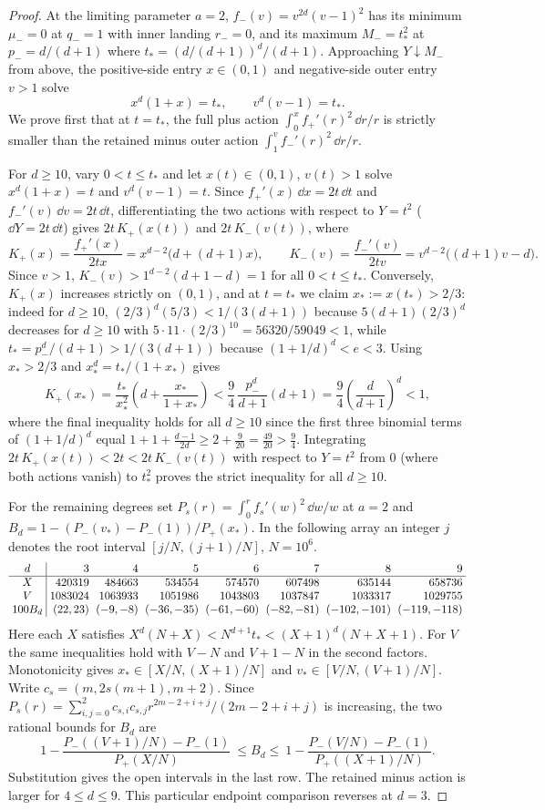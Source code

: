 \begin{proof}
At the limiting parameter $a=2$, $f_-(v)=v^{2d}(v-1)^2$ has its minimum $\mu_-=0$ at $q_-=1$ with inner landing $r_-=0$, and its maximum $M_-=t_*^2$ at $p_-=d/(d+1)$ where $t_*=(d/(d+1))^d/(d+1)$. Approaching $Y\downarrow M_-$ from above, the positive-side entry $x\in(0,1)$ and negative-side outer entry $v>1$ solve
\[
  x^d(1+x) = t_*,\qquad v^d(v-1) = t_*.
\]
We prove first that at $t=t_*$, the full plus action $\int_0^x f_+'(r)^2\,\dd r/r$ is strictly smaller than the retained minus outer action $\int_1^v f_-'(r)^2\,\dd r/r$.

For $d\ge 10$, vary $0<t\le t_*$ and let $x(t)\in(0,1)$, $v(t)>1$ solve $x^d(1+x)=t$ and $v^d(v-1)=t$. Since $f_+'(x)\,\dd x=2t\,\dd t$ and $f_-'(v)\,\dd v=2t\,\dd t$, differentiating the two actions with respect to $Y=t^2$ ($\dd Y=2t\,\dd t$) gives $2t\,K_+(x(t))$ and $2t\,K_-(v(t))$, where
\[
  K_+(x) = \frac{f_+'(x)}{2tx} = x^{d-2}\big(d+(d+1)x\big),\qquad
  K_-(v) = \frac{f_-'(v)}{2tv} = v^{d-2}\big((d+1)v-d\big).
\]
Since $v>1$, $K_-(v)>1^{d-2}(d+1-d)=1$ for all $0<t\le t_*$. Conversely, $K_+(x)$ increases strictly on $(0,1)$, and at $t=t_*$ we claim $x_*:=x(t_*)>2/3$: indeed for $d\ge 10$, $(2/3)^d(5/3)<1/(3(d+1))$ because $5(d+1)(2/3)^d$ decreases for $d\ge 10$ with $5\cdot 11\cdot(2/3)^{10}=56320/59049<1$, while $t_*=p_-^d/(d+1)>1/(3(d+1))$ because $(1+1/d)^d<e<3$. Using $x_*>2/3$ and $x_*^d=t_*/(1+x_*)$ gives
\[
  K_+(x_*) = \frac{t_*}{x_*^2}\!\left(d + \frac{x_*}{1+x_*}\right) < \frac{9}{4}\,\frac{p_-^d}{d+1}(d+1) = \frac{9}{4}\!\left(\frac{d}{d+1}\right)^{\!d} < 1,
\]
where the final inequality holds for all $d\ge 10$ since the first three binomial terms of $(1+1/d)^d$ equal $1+1+\frac{d-1}{2d}\ge 2+\frac{9}{20}=\frac{49}{20}>\frac{9}{4}$. Integrating $2t\,K_+(x(t))<2t<2t\,K_-(v(t))$ with respect to $Y=t^2$ from $0$ (where both actions vanish) to $t_*^2$ proves the strict inequality for all $d\ge 10$.

For the remaining degrees set $P_s(r)=\int_0^r f_s'(w)^2\,\dd w/w$ at $a=2$ and
$B_d=1-(P_-(v_*)-P_-(1))/P_+(x_*)$. In the following array an integer $j$
denotes the root interval $[j/N,(j+1)/N]$, $N=10^6$.
{\scriptsize\[
\setlength{\arraycolsep}{3pt}
\begin{array}{c|rrrrrrr}
d &3&4&5&6&7&8&9\\\hline
X &420319&484663&534554&574570&607498&635144&658736\\
V &1083024&1063933&1051986&1043803&1037847&1033317&1029755\\
100B_d & (22,23)&(-9,-8)&(-36,-35)&(-61,-60)&(-82,-81)&(-102,-101)&(-119,-118)
\end{array}
\]}
Here each $X$ satisfies $X^d(N+X)<N^{d+1}t_*<(X+1)^d(N+X+1)$.
For $V$ the same inequalities hold with $V-N$ and $V+1-N$ in the
second factors. Monotonicity gives $x_*\in[X/N,(X+1)/N]$ and
$v_*\in[V/N,(V+1)/N]$. Write $c_s=(m,2s(m+1),m+2)$.
Since $P_s(r)=\sum_{i,j=0}^2 c_{s,i}c_{s,j}r^{2m-2+i+j}/(2m-2+i+j)$
is increasing, the two rational bounds for $B_d$ are
\[
1-\frac{P_-((V+1)/N)-P_-(1)}{P_+(X/N)}
\ \le B_d\le\
1-\frac{P_-(V/N)-P_-(1)}{P_+((X+1)/N)} .
\]
Substitution gives the open intervals in the last row. The retained
minus action is larger for $4\le d\le9$. This particular endpoint
comparison reverses at $d=3$.


\end{proof}
